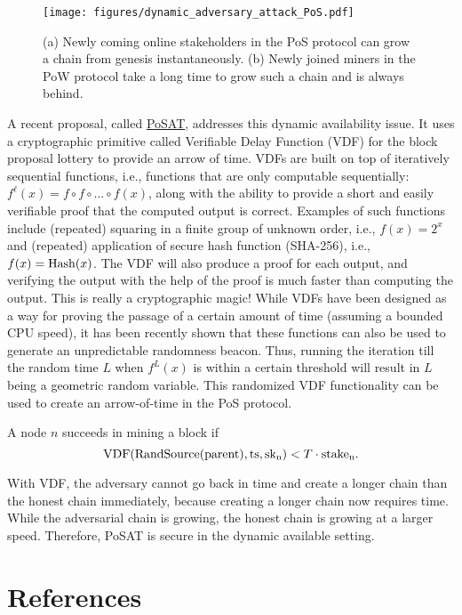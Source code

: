 \documentclass{article}
\begin{document}
\begin{figure}
    \centering
    \texttt{[image: figures/dynamic\_adversary\_attack\_PoS.pdf]}
    \caption{(a) Newly coming online stakeholders in the PoS protocol can grow a chain from genesis instantaneously. (b) Newly joined miners in the PoW protocol take a long time to grow such a chain and is always behind.}
    \label{fig:aot}
\end{figure}

A recent proposal, called \href{https://arxiv.org/pdf/2010.08154.pdf}{PoSAT}, addresses this dynamic availability issue. It uses a cryptographic primitive called Verifiable Delay Function (VDF) for the block proposal lottery to provide an arrow of time. VDFs are built on top of iteratively sequential functions, i.e., functions that are only computable sequentially: $f^{\ell}(x) = f \circ f \circ ... \circ f(x)$, along with the ability to provide a short and easily verifiable proof that the computed output is correct. Examples of such functions include (repeated) squaring in a finite group of unknown order, i.e., $f(x)=2^x$ and (repeated) application of secure hash function (SHA-256), i.e., $f(x) = {\rm Hash}(x)$. The VDF will also produce a proof for each output, and verifying the output with the help of the proof is much faster than computing the output. This is really a cryptographic magic! While VDFs have been designed as a way for proving the passage of a certain amount of time (assuming a bounded CPU speed), it has been recently shown that these functions can also be used to generate an unpredictable randomness beacon. Thus, running the iteration till the random time $L$ when $f^{L}(x)$ is within a certain threshold will result in $L$ being a geometric random variable. This randomized VDF functionality can be used to create an arrow-of-time in the PoS protocol. 

 A node $n$ succeeds in mining a block if
\begin{equation}
    \label{eqn:pos6}
    {\rm VDF(RandSource(parent),ts,sk_n)} < T\cdot{\rm stake_n}.
\end{equation}

With VDF, the adversary cannot go back in time and create a longer chain than the honest chain immediately, because creating a longer chain now requires time. While the adversarial chain is growing, the honest chain is growing at a larger speed. Therefore, PoSAT is secure in the dynamic available setting.


\section*{References}
\end{document}
